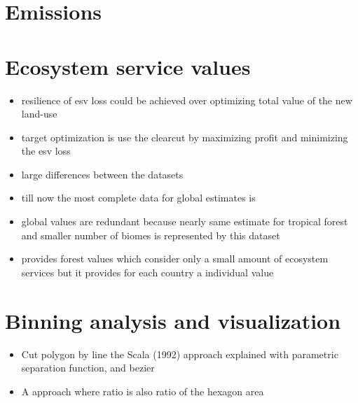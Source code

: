 	\section{Emissions}

	\section{Ecosystem service values}
		\begin{itemize}
			\item resilience of esv loss could be achieved over optimizing total value of the new land-use
			\item target optimization is use the clearcut by maximizing profit and minimizing the esv loss
			\item large differences between the datasets
			\item till now the most complete data for global estimates is \citeauthor{Costanza2014}
			\item \citeauthor{Groot2012} global values are redundant because nearly same estimate for tropical forest and smaller number of biomes is represented by this dataset
			\item \citeauthor{Siikamaki2015} provides forest values which consider only a small amount of ecosystem services but it provides for each country a individual value
		\end{itemize}

	\section{Binning analysis and visualization}
		\begin{itemize}
			\item Cut polygon by line the Scala (1992) approach explained with parametric separation function, and bezier
			\item A approach where ratio is also ratio of the hexagon area
		\end{itemize}

